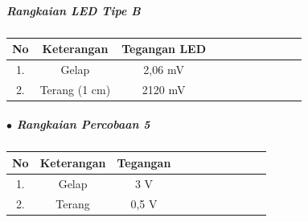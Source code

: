 \documentclass[12pt,a4paper]{article}
\begin{document}
\subparagraph*{ Rangkaian LED Tipe B}
\begin{tabular}{|c|c|c|c|c|c|c|c|c|c|c|}        \hline
No & Keterangan     & Tegangan LED   \\ \hline 
1. & Gelap          & 2,06  mV       \\ \hline
2. & Terang (1 cm)  & 2120  mV       \\ \hline
 \end{tabular}
 
\subparagraph*{$\bullet$ Rangkaian Percobaan 5 }
\subparagraph*{ }
\begin{tabular}{|c|c|c|c|c|c|c|c|c|c|c|}        \hline
No & Keterangan     & Tegangan     \\ \hline 
1. & Gelap          & 3    V       \\ \hline
2. & Terang         & 0,5  V       \\ \hline

 \end{tabular}


\newpage
\end{document}
